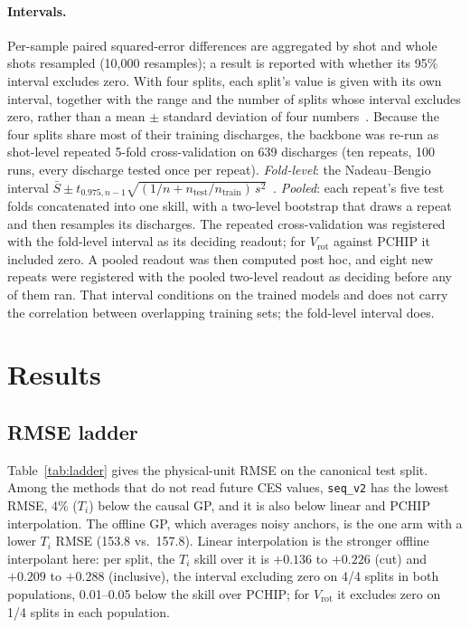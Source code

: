 \documentclass[10pt,twocolumn,letterpaper]{article}
\newcommand{\Ti}{\ensuremath{T_i}}
\newcommand{\Vrot}{\ensuremath{V_\mathrm{rot}}}
\newcommand{\seqv}{\texttt{seq\_v2}}
\begin{document}
\paragraph{Intervals.} Per-sample paired squared-error differences are aggregated by
shot and whole shots resampled (10{,}000 resamples); a result is reported with whether
its 95\% interval excludes zero. With four splits, each split's value is given with its own interval, together with the range and the number of splits whose interval excludes zero, rather than a mean $\pm$ standard deviation of four numbers~\citep{Weissgerber2015Beyond,Agarwal2021Deep}. Because the four splits share most of their training
discharges, the backbone was re-run as shot-level repeated 5-fold cross-validation on
639 discharges (ten repeats, 100 runs, every discharge tested once per repeat).
\emph{Fold-level}: the Nadeau--Bengio interval
$\bar S \pm t_{0.975,n-1}\sqrt{(1/n + n_{\mathrm{test}}/n_{\mathrm{train}})\,s^2}$~\citep{Nadeau2003Inference}.
\emph{Pooled}: each repeat's five test folds concatenated into one skill, with a
two-level bootstrap that draws a repeat and then resamples its discharges. The repeated
cross-validation was registered with the fold-level interval as its deciding readout;
for \Vrot{} against PCHIP it included zero. A pooled readout was then computed post
hoc, and eight new repeats were registered with the pooled two-level readout as
deciding before any of them ran. That interval conditions on the trained models and
does not carry the correlation between overlapping training sets; the fold-level
interval does.

\section{Results}
\label{sec:results}

\subsection{RMSE ladder}
\label{sec:res:ladder}
Table~\ref{tab:ladder} gives the physical-unit RMSE on the canonical test split. Among
the methods that do not read future CES values, \seqv{} has the lowest RMSE, 4\% (\Ti)
below the causal GP, and it is also below linear and PCHIP
interpolation. The offline GP, which averages noisy anchors, is the one arm with a
lower \Ti{} RMSE (153.8 vs.\ 157.8). Linear interpolation is the stronger offline
interpolant here: per split, the \Ti{} skill over it is $+0.136$ to $+0.226$ (cut) and
$+0.209$ to $+0.288$ (inclusive), the interval excluding zero on 4/4 splits in both
populations, 0.01--0.05 below the skill over PCHIP; for \Vrot{} it excludes zero on
1/4 splits in each population.
\end{document}
